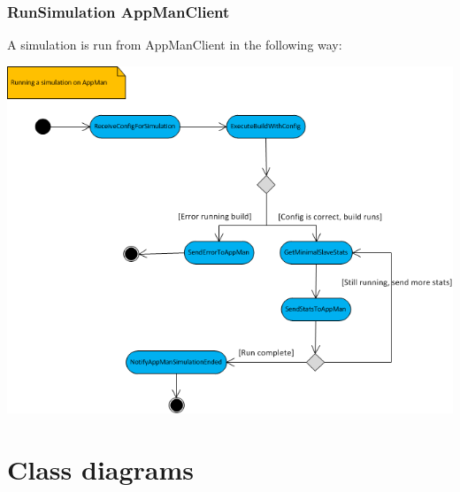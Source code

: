 \documentclass[a4paper,12pt,final]{article}
\begin{document}
\subsubsection{RunSimulation AppManClient}
A simulation is run from AppManClient in the following way:
\begin{center}
\includegraphics[scale=0.9]{RunningASimOnAppManClient.png}
\end{center}



\newpage
\section{Class diagrams}
\end{document}
